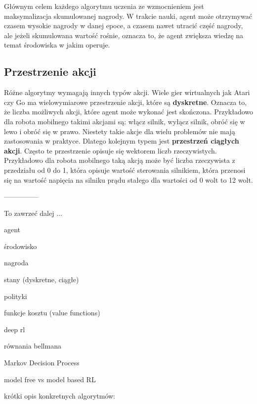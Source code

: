 Głównym celem każdego algorytmu uczenia ze wzmocnieniem jest maksymalizacja 
skumulowanej nagrody. W trakcie nauki, agent może otrzymywać czasem wysokie 
nagrody w danej epoce, a czasem nawet utracić część nagrody, ale jeżeli 
skumulowana wartość rośnie, oznacza to, że agent zwiększa wiedzę na temat 
środowiska w jakim operuje.

\subsection{Przestrzenie akcji}

Różne algorytmy wymagają innych typów akcji. Wiele gier wirtualnych jak Atari 
czy Go ma wielowymiarowe przestrzenie akcji, które są \textbf{dyskretne}. 
Oznacza to, że liczba możliwych akcji, które agent może wykonać jest skończona. 
Przykładowo dla robota mobilnego takimi akcjami są: włącz silnik, wyłącz 
silnik, obróć się w lewo i obróć się w prawo. Niestety takie akcje dla wielu 
problemów nie mają zastosowania w praktyce. Dlatego kolejnym typem jest 
\textbf{przestrzeń ciągłych akcji}. Często te przestrzenie opisuje się wektorem 
liczb rzeczywistych. Przykładowo dla robota mobilnego taką akcją może być 
liczba rzeczywista z przedziału od 0 do 1, która opisuje wartość sterowania 
silnikiem, która przenosi się na wartość napięcia na silniku prądu stałego dla 
wartości od 0 wolt to 12 wolt.
 
---------------

To zawrzeć dalej $\dots$

agent

środowisko

nagroda

stany (dyskretne, ciągłe)

polityki

funkcje kosztu (value functions)

deep rl

równania bellmana

Markov Decision Process

model free vs model based RL



krótki opis konkretnych algorytmów:


